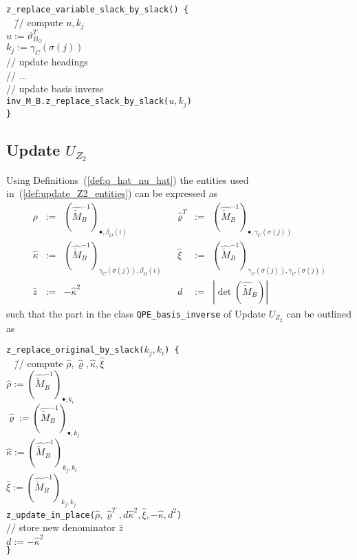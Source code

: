 \documentclass[a4paper]{article}
\begin{document}
\begin{tabbing}
\texttt{z\_replace\_variable\_slack\_by\_slack() \{} \\
\texttt{  } \= // compute $u, k_{j}$ \\
\> \texttt{$u:=\vartheta_{B_{O}}^{T}$} \\
\> \texttt{$k_{j}:=\gamma_{C}(\sigma(j))$} \\
\> // update headings \\
\> // ... \\
\> // update basis inverse \\
\> \texttt{inv\_M\_B.z\_replace\_slack\_by\_slack($u, k_{j}$)}
\\
\texttt{\}}
\end{tabbing}


\subsection{Update $U_{Z_{2}}$}
Using Definitions~(\ref{def:q_hat_nu_hat}) the entities used
in~(\ref{def:update_Z2_entities}) can be expressed as
\begin{equation}
\label{def:update_Z2_entities_prep}
\begin{array}{rclcrcl}
\hat{\rho}
&:=&
\left(
  \hat{\check{M}}_{B}^{-1}
\right)_{\bullet, \beta_{O}(i)}
&&
\hat{\varrho}^{T}
&:=&
\left(
  \hat{\check{M}}_{B}^{-1}
\right)_{\bullet, \gamma_{C}(\sigma(j))}
\\
\hat{\kappa}
&:=&
\left(
  \hat{\check{M}}_{B}^{-1}
\right)_{\gamma_{C}(\sigma(j)), \beta_{O}(i)}
&&
\hat{\xi}
&:=&
\left(
  \hat{\check{M}}_{B}^{-1}
\right)_{\gamma_{C}(\sigma(j)), \gamma_{C}(\sigma(j))}
\\
\hat{z}
&:=&
-\hat{\kappa}^{2}
&&
d
&:=&
\left|\det(\hat{\check{M}}_{B})\right|
\end{array}
\end{equation}
such that the part in the class \texttt{QPE\_basis\_inverse} of
Update $U_{Z_{2}}$ can be outlined as
\begin{tabbing}
\texttt{z\_replace\_original\_by\_slack($k_{j}, k_{i}$) \{} \\
\texttt{  } \= // compute $\hat{\rho}, \hat{\varrho}, \hat{\kappa},
\hat{\xi}$ \\
\> \texttt{$\hat{\rho}:=
  \left(\hat{\check{M}}_{B}^{-1}\right)_{\bullet, k_{i}}$} \\
\> \texttt{$\hat{\varrho}:=
  \left(\hat{\check{M}}_{B}^{-1}\right)_{\bullet, k_{j}}$} \\
\> \texttt{$\hat{\kappa}:=
  \left(\hat{\check{M}}_{B}^{-1}\right)_{k_{j}, k_{i}}$} \\
\> \texttt{$\hat{\xi}:=
  \left(\hat{\check{M}}_{B}^{-1}\right)_{k_{j}, k_{j}}$} \\    
\> \texttt{z\_update\_in\_place($\hat{\rho}, \hat{\varrho}^{T},
d\hat{\kappa}^{2}, \hat{\xi}, -\hat{\kappa}, d^{2}$)} \\
\> // store new denominator $\hat{z}$ \\
\> \texttt{$d:=-\hat{\kappa}^{2}$} \\
\texttt{\}}
\end{tabbing}
\end{document}
